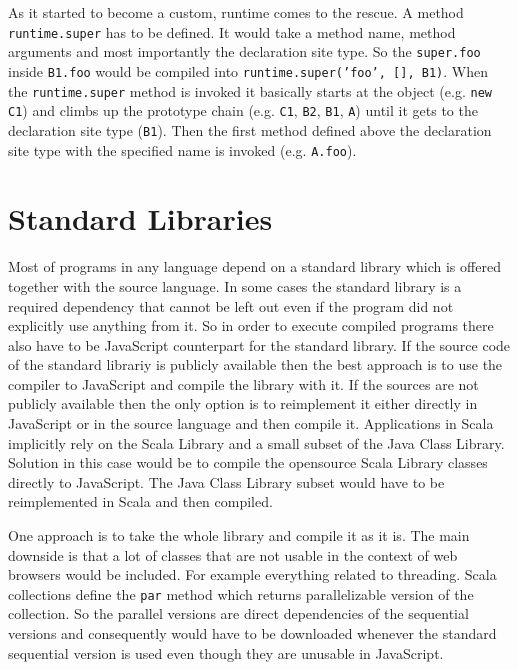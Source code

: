 \documentclass[12pt,a4paper]{report}
\begin{document}
As it started to become a custom, runtime comes to the rescue. A method \texttt{runtime.super} has to be defined. It would take a method name, method arguments and most importantly the declaration site type. So the \texttt{super.foo} inside \texttt{B1.foo} would be compiled into \texttt{runtime.super('foo', [], B1)}. When the \texttt{runtime.super} method is invoked it basically starts at the object (e.g. \texttt{new C1}) and climbs up the prototype chain (e.g. \texttt{C1}, \texttt{B2}, \texttt{B1}, \texttt{A}) until it gets to the declaration site type (\texttt{B1}). Then the first method defined above the declaration site type with the specified name is invoked (e.g. \texttt{A.foo}).

\section{Standard Libraries}

Most of programs in any language depend on a standard library which is offered together with the source language. In some cases the standard library is a required dependency that cannot be left out even if the program did not explicitly use anything from it. So in order to execute compiled programs there also have to be JavaScript counterpart for the standard library. If the source code of the standard librariy is publicly available then the best approach is to use the compiler to JavaScript and compile the library with it. If the sources are not publicly available then the only option is to reimplement it either directly in JavaScript or in the source language and then compile it. Applications in Scala implicitly rely on the Scala Library \cite{ScalaLibrary} and a small subset of the Java Class Library. Solution in this case would be to compile the opensource Scala Library classes directly to JavaScript. The Java Class Library subset would have to be reimplemented in Scala and then compiled.

One approach is to take the whole library and compile it as it is. The main downside is that a lot of classes that are not usable in the context of web browsers would be included. For example everything related to threading. Scala collections define the \texttt{par} method which returns parallelizable version of the collection. So the parallel versions are direct dependencies of the sequential versions and consequently would have to be downloaded whenever the standard sequential version is used even though they are unusable in JavaScript.
\end{document}

